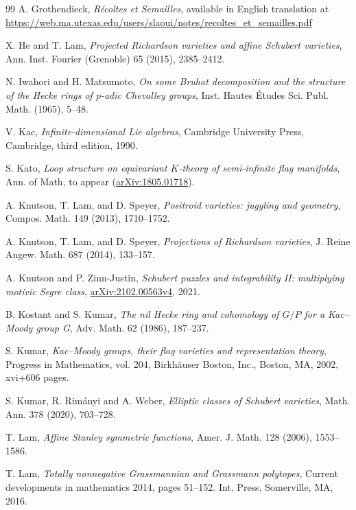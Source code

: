 \documentclass[12pt]{amsart}
\begin{document}
\begin{thebibliography}{99}
A. Grothendieck, 
{\it R\'ecoltes et Semailles}, available in English translation at 
\url{https://web.ma.utexas.edu/users/slaoui/notes/recoltes_et_semailles.pdf}

 
X. He  and T. Lam, {\em
Projected Richardson varieties and affine Schubert varieties},
Ann. Inst. Fourier (Grenoble)   65 (2015),   2385--2412. 

N. Iwahori and H. Matsumoto, {\em On some Bruhat decomposition and the structure of the Hecke rings of $p$-adic Chevalley groups}, Inst. Hautes \'Etudes Sci. Publ. Math. (1965),  5--48.

V. Kac, {\em Infinite-dimensional Lie algebras}, Cambridge University Press, Cambridge, third edition, 1990.

S. Kato, {\em Loop structure on equivariant $K$-theory of semi-infinite flag manifolds},  Ann. of Math, to appear (\href{https://arxiv.org/abs/1805.01718}{arXiv:1805.01718}).



A. Knutson, T. Lam, and D. Speyer, {\em Positroid varieties: juggling and geometry}, Compos. Math. 149 (2013),  1710--1752. 

A. Knutson, T. Lam, and D. Speyer, {\em Projections of Richardson varieties}, J. Reine Angew. Math. 687 (2014), 133--157.

 A. Knutson and P. Zinn-Justin, {\em  Schubert puzzles and integrability II: multiplying motivic Segre class}, 
\href{https://arxiv.org/abs/2102.00563}{arXiv:2102.00563v4}, 2021.





B. Kostant and S. Kumar, {\em The nil Hecke ring and cohomology of $G/P$ for a Kac--Moody group G}, Adv.  Math. 62 (1986),  187--237.

S. Kumar, {\em Kac--Moody groups, their flag varieties and representation theory},
Progress in Mathematics, vol. 204, Birkh\"auser Boston, Inc., Boston, MA, 2002, xvi+606 pages.

S. Kumar, R. Rim\'anyi  and A. Weber, {\em  Elliptic classes of Schubert varieties}, Math. Ann. 378 (2020), 703–728.

T. Lam, {\em Affine Stanley symmetric functions}, 
Amer. J. Math. 128 (2006), 1553--1586.



T. Lam, {\em Totally nonnegative Grassmannian and Grassmann polytopes},  Current developments in mathematics 2014, pages 51--152. Int. Press, Somerville, MA, 2016.




\end{thebibliography}
\end{document}
